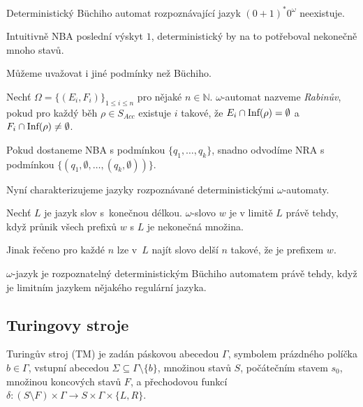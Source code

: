 \begin{claim}
    Deterministický Büchiho automat rozpoznávající jazyk
    $(0+1)^*0^\omega$ neexistuje.
\end{claim}

Intuitivně NBA  poslední výskyt $1$,
deterministický by na to potřeboval nekonečně mnoho stavů.

Můžeme uvažovat i jiné podmínky než Büchiho.

\begin{definition}
    Nechť $\Omega = \{(E_i, F_i)\}_{1 \leq i \leq n}$ pro nějaké
    $n \in \mathbb{N}$.
    $\omega$-automat nazveme {\em Rabinův},
    pokud pro každý běh $\rho \in S_{Acc}$
    existuje $i$ takové, že \linebreak
    $E_i \cap \text{Inf}(\rho) = \emptyset$
    a
    $F_i \cap \text{Inf}(\rho) \neq \emptyset$.
\end{definition}

Pokud dostaneme NBA s podmínkou $\{q_1, \ldots, q_k\}$,
snadno odvodíme NRA s podmínkou $\{(q_1, \emptyset, \ldots, (q_k, \emptyset))\}$.

\begin{example}
\end{example}

Nyní charakterizujeme jazyky rozpoznávané deterministickými $\omega$-automaty.

\begin{definition}
    Nechť $L$ je jazyk slov s~konečnou délkou.
    $\omega$-slovo $w$ je v limitě $L$ právě tehdy,
    když průnik všech prefixů $w$ s $L$ je nekonečná množina.
\end{definition}

Jinak řečeno pro každé $n$ lze v~$L$ najít slovo delší $n$ takové, že
je prefixem $w$.

\begin{theorem}
$\omega$-jazyk je rozpoznatelný deterministickým Büchiho automatem
právě tehdy, když je limitním jazykem nějakého regulární jazyka.
\end{theorem}


\subsection{Turingovy stroje}

\begin{definition}
    Turingův stroj (TM) je zadán
    páskovou abecedou $\Gamma$,
    symbolem prázdného políčka $b \in \Gamma$,
    vstupní abecedou $\Sigma \subseteq \Gamma \setminus \{b\}$,
    množinou stavů $S$,
    počátečním stavem $s_0$,
    množinou koncových stavů $F$,
    a přechodovou funkcí \linebreak
    $\delta : (S \setminus F) \times \Gamma
        \to S \times \Gamma \times \{L,R\}$.
\end{definition}

